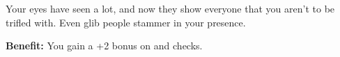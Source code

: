 
Your eyes have seen a lot, and now they show everyone that you aren't to be trifled with. Even glib people stammer in your presence.

\textbf{Benefit:} You gain a +2 bonus on  and  checks.